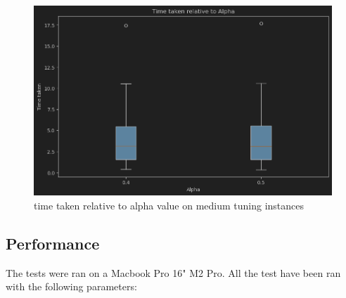 \documentclass{article}
\begin{document}
\begin{figure}[H]
	\includegraphics[width=\linewidth]{time_alpha_grasp_med.png}
	\caption{time taken relative to alpha value on medium tuning instances}
\end{figure}


\subsection*{Performance}
The tests were ran on a Macbook Pro 16" M2 Pro. All the test have been ran with the following parameters: 
\end{document}
